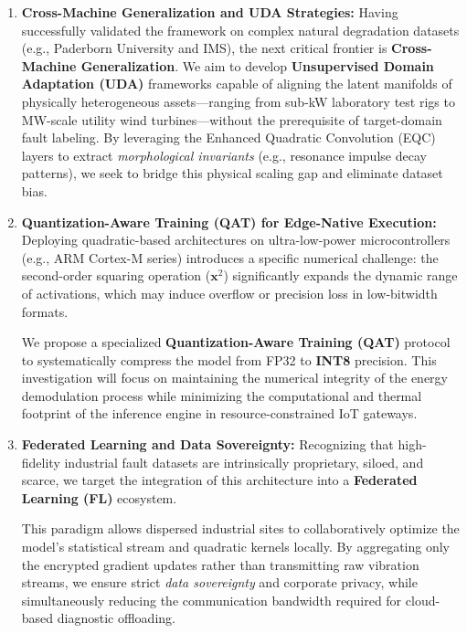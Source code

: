 \documentclass[5p,times,twocolumn]{elsarticle}
\begin{document}
\begin{enumerate}
    \item \textbf{Cross-Machine Generalization and UDA Strategies:} 
    Having successfully validated the framework on complex natural degradation datasets (e.g., Paderborn University and IMS), the next critical frontier is \textbf{Cross-Machine Generalization}. We aim to develop \textbf{Unsupervised Domain Adaptation (UDA)} frameworks capable of aligning the latent manifolds of physically heterogeneous assets---ranging from sub-kW laboratory test rigs to MW-scale utility wind turbines---without the prerequisite of target-domain fault labeling. By leveraging the Enhanced Quadratic Convolution (EQC) layers to extract \textit{morphological invariants} (e.g., resonance impulse decay patterns), we seek to bridge this physical scaling gap and eliminate dataset bias.

    

    \item \textbf{Quantization-Aware Training (QAT) for Edge-Native Execution:} 
    Deploying quadratic-based architectures on ultra-low-power microcontrollers (e.g., ARM Cortex-M series) introduces a specific numerical challenge: the second-order squaring operation ($\mathbf{x}^2$) significantly expands the dynamic range of activations, which may induce overflow or precision loss in low-bitwidth formats. 
    
    We propose a specialized \textbf{Quantization-Aware Training (QAT)} protocol to systematically compress the model from FP32 to \textbf{INT8} precision. This investigation will focus on maintaining the numerical integrity of the energy demodulation process while minimizing the computational and thermal footprint of the inference engine in resource-constrained IoT gateways.

    

    \item \textbf{Federated Learning and Data Sovereignty:} 
    Recognizing that high-fidelity industrial fault datasets are intrinsically proprietary, siloed, and scarce, we target the integration of this architecture into a \textbf{Federated Learning (FL)} ecosystem.
    
    This paradigm allows dispersed industrial sites to collaboratively optimize the model's statistical stream and quadratic kernels locally. By aggregating only the encrypted gradient updates rather than transmitting raw vibration streams, we ensure strict \textit{data sovereignty} and corporate privacy, while simultaneously reducing the communication bandwidth required for cloud-based diagnostic offloading.
\end{enumerate}
\end{document}
